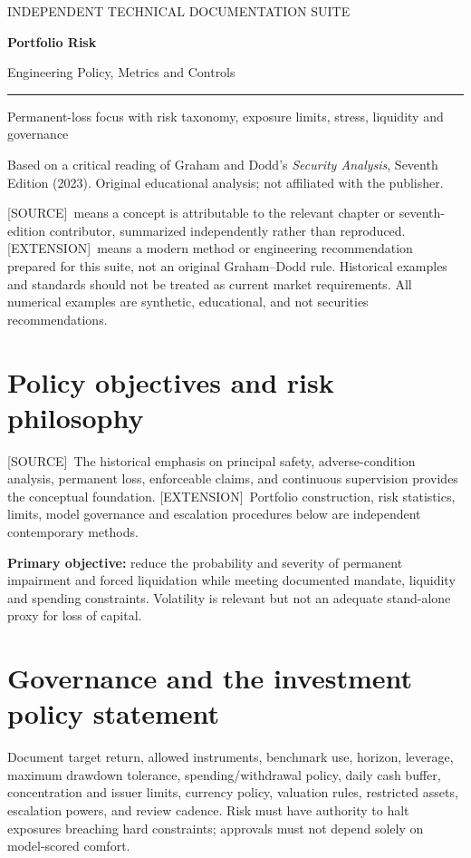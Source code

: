 \documentclass[11pt,letterpaper]{article}
\newcommand{\term}[1]{\textbf{\color{ink}#1}}
\newcommand{\src}{\textsf{\color{sea}[SOURCE]}}
\newcommand{\ext}{\textsf{\color{gold}[EXTENSION]}}
\newcommand{\cover}[3]{%
\hypersetup{pageanchor=false}%
\begin{titlepage}\pagecolor{ink}\color{white}\vspace*{1.15in}
{\sffamily\large\color{gold}INDEPENDENT TECHNICAL DOCUMENTATION SUITE\par}\vspace{0.4in}
{\Huge\sffamily\bfseries #1\par}\vspace{0.15in}
{\Large\sffamily #2\par}\vspace{0.65in}
\color{gold}\rule{\textwidth}{2pt}\par\vspace{0.4in}
{\large #3\par}\vfill
{\small\sffamily Based on a critical reading of Graham and Dodd's \emph{Security Analysis}, Seventh Edition (2023). Original educational analysis; not affiliated with the publisher.\par}
\end{titlepage}\hypersetup{pageanchor=true}\nopagecolor\color{black}}
\newcommand{\front}[3]{\cover{#1}{#2}{#3}\tableofcontents\clearpage
\begin{sourcebox}\src\ means a concept is attributable to the relevant chapter or seventh-edition contributor, summarized independently rather than reproduced. \ext\ means a modern method or engineering recommendation prepared for this suite, not an original Graham--Dodd rule. Historical examples and standards should not be treated as current market requirements. All numerical examples are synthetic, educational, and not securities recommendations.\end{sourcebox}}
\begin{document}
\front{Portfolio Risk}{Engineering Policy, Metrics and Controls}{Permanent-loss focus with risk taxonomy, exposure limits, stress, liquidity and governance}

\section{Policy objectives and risk philosophy}
\src\ The historical emphasis on principal safety, adverse-condition analysis, permanent loss, enforceable claims, and continuous supervision provides the conceptual foundation. \ext\ Portfolio construction, risk statistics, limits, model governance and escalation procedures below are independent contemporary methods.

\term{Primary objective:} reduce the probability and severity of permanent impairment and forced liquidation while meeting documented mandate, liquidity and spending constraints. Volatility is relevant but not an adequate stand-alone proxy for loss of capital.

\section{Governance and the investment policy statement}
Document target return, allowed instruments, benchmark use, horizon, leverage, maximum drawdown tolerance, spending/withdrawal policy, daily cash buffer, concentration and issuer limits, currency policy, valuation rules, restricted assets, escalation powers, and review cadence. Risk must have authority to halt exposures breaching hard constraints; approvals must not depend solely on model-scored comfort.
\end{document}
